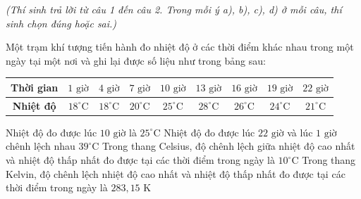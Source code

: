 \vspace{0.15cm}
\begin{flushleft}
	{\color{blue!50!green}}
	\textit{\small (Thí sinh trả lời từ câu 1 đến câu 2. Trong mỗi ý a), b), c), d) ở mỗi câu, thí sinh chọn đúng hoặc sai.)}
\end{flushleft}
\setcounter{ex}{0}

\begin{ex}
	Một trạm khí tượng tiến hành đo nhiệt độ ở các thời điểm khác nhau trong một ngày tại một nơi và ghi lại được số liệu như trong bảng sau:
	\begin{center}
	\begin{tabular}{|c|c|c|c|c|c|c|c|c|}
		\hline
		\textbf{Thời gian} & $1\text{ giờ}$ & $4\text{ giờ}$ & $7\text{ giờ}$ & $10\text{ giờ}$ & $13\text{ giờ}$ & $16\text{ giờ}$ & $19\text{ giờ}$ & $22\text{ giờ}$ \\ \hline
		\textbf{Nhiệt độ} & $18^\circ\text{C}$ & $18^\circ\text{C}$ & $20^\circ\text{C}$ & $25^\circ\text{C}$ & $28^\circ\text{C}$ & $26^\circ\text{C}$ & $24^\circ\text{C}$ & $21^\circ\text{C}$ \\ \hline
	\end{tabular}
	\end{center}
	\choiceTF
	{\True Nhiệt độ đo được lúc $10\text{ giờ}$ là $25^\circ\text{C}$}
	{Nhiệt độ đo được lúc $22\text{ giờ}$ và lúc $1\text{ giờ}$ chênh lệch nhau $39^\circ\text{C}$}
	{\True Trong thang Celsius, độ chênh lệch giữa nhiệt độ cao nhất và nhiệt độ thấp nhất đo được tại các thời điểm trong ngày là $10^\circ\text{C}$}
	{Trong thang Kelvin, độ chênh lệch nhiệt độ cao nhất và nhiệt độ thấp nhất đo được tại các thời điểm trong ngày là $283{,}15\text{ K}$}
\end{ex}

